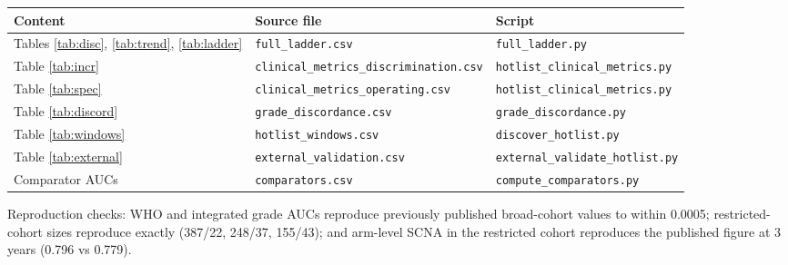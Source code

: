 \documentclass[11pt]{article}
\begin{document}
\begin{table}[H]
\centering
\small
\begin{tabular}{lll}
\toprule
Content & Source file & Script \\
\midrule
Tables \ref{tab:disc}, \ref{tab:trend}, \ref{tab:ladder} & \texttt{full\_ladder.csv} & \texttt{full\_ladder.py} \\
Table \ref{tab:incr} & \texttt{clinical\_metrics\_discrimination.csv} & \texttt{hotlist\_clinical\_metrics.py} \\
Table \ref{tab:spec} & \texttt{clinical\_metrics\_operating.csv} & \texttt{hotlist\_clinical\_metrics.py} \\
Table \ref{tab:discord} & \texttt{grade\_discordance.csv} & \texttt{grade\_discordance.py} \\
Table \ref{tab:windows} & \texttt{hotlist\_windows.csv} & \texttt{discover\_hotlist.py} \\
Table \ref{tab:external} & \texttt{external\_validation.csv} & \texttt{external\_validate\_hotlist.py} \\
Comparator AUCs & \texttt{comparators.csv} & \texttt{compute\_comparators.py} \\
\bottomrule
\end{tabular}
\end{table}

Reproduction checks: WHO and integrated grade AUCs reproduce previously
published broad-cohort values to within 0.0005; restricted-cohort sizes
reproduce exactly (387/22, 248/37, 155/43); and arm-level SCNA in the restricted
cohort reproduces the published figure at 3 years (0.796 vs 0.779).
\end{document}
